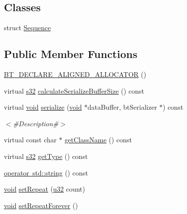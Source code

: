 \subsection*{Classes}
\begin{DoxyCompactItemize}
\item 
struct \mbox{\hyperlink{structnjli_1_1_action_1_1_sequence}{Sequence}}
\end{DoxyCompactItemize}
\subsection*{Public Member Functions}
\begin{DoxyCompactItemize}
\item 
\mbox{\hyperlink{classnjli_1_1_action_a6b97581cbad92f763e70e0f1885c3d05}{B\+T\+\_\+\+D\+E\+C\+L\+A\+R\+E\+\_\+\+A\+L\+I\+G\+N\+E\+D\+\_\+\+A\+L\+L\+O\+C\+A\+T\+OR}} ()
\item 
virtual \mbox{\hyperlink{_util_8h_aa62c75d314a0d1f37f79c4b73b2292e2}{s32}} \mbox{\hyperlink{classnjli_1_1_action_a43afd1030b91fcef5a949af8ffc452da}{calculate\+Serialize\+Buffer\+Size}} () const
\item 
virtual \mbox{\hyperlink{_thread_8h_af1e856da2e658414cb2456cb6f7ebc66}{void}} \mbox{\hyperlink{classnjli_1_1_action_a12e735927e2340525708f522d8daff88}{serialize}} (\mbox{\hyperlink{_thread_8h_af1e856da2e658414cb2456cb6f7ebc66}{void}} $\ast$data\+Buffer, bt\+Serializer $\ast$) const
\begin{DoxyCompactList}\small\item\em $<$\#\+Description\#$>$ \end{DoxyCompactList}\item 
virtual const char $\ast$ \mbox{\hyperlink{classnjli_1_1_action_a72329c3d6bc5e8b701aad6732bbf5537}{get\+Class\+Name}} () const
\item 
virtual \mbox{\hyperlink{_util_8h_aa62c75d314a0d1f37f79c4b73b2292e2}{s32}} \mbox{\hyperlink{classnjli_1_1_action_a16970f3b547f326476ffd6d0d1feb3bf}{get\+Type}} () const
\item 
\mbox{\hyperlink{classnjli_1_1_action_a38686442a833ff5d6039d61b7f0ef6e1}{operator std\+::string}} () const
\item 
\mbox{\hyperlink{_thread_8h_af1e856da2e658414cb2456cb6f7ebc66}{void}} \mbox{\hyperlink{classnjli_1_1_action_ac660ece5790dced62b28f6ec0199c1d7}{set\+Repeat}} (\mbox{\hyperlink{_util_8h_a10e94b422ef0c20dcdec20d31a1f5049}{u32}} count)
\item 
\mbox{\hyperlink{_thread_8h_af1e856da2e658414cb2456cb6f7ebc66}{void}} \mbox{\hyperlink{classnjli_1_1_action_a63707be93052a5843662ca386ff39fca}{set\+Repeat\+Forever}} ()

\end{DoxyCompactItemize}
